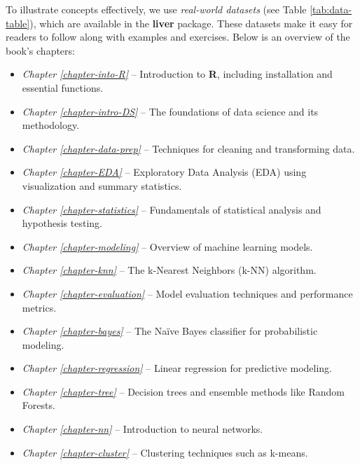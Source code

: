 \documentclass[
  11pt,
]{book}
\providecommand{\tightlist}{%
  \setlength{\itemsep}{0pt}\setlength{\parskip}{0pt}}
\theoremstyle{definition}
\theoremstyle{definition}
\theoremstyle{definition}
\theoremstyle{definition}
\theoremstyle{remark}
\begin{document}
To illustrate concepts effectively, we use \emph{real-world datasets} (see Table \ref{tab:data-table}), which are available in the \textbf{liver} package. These datasets make it easy for readers to follow along with examples and exercises. Below is an overview of the book's chapters:

\begin{itemize}
\tightlist
\item
  \emph{Chapter \ref{chapter-into-R}} -- Introduction to \textbf{R}, including installation and essential functions.\\
\item
  \emph{Chapter \ref{chapter-intro-DS}} -- The foundations of data science and its methodology.\\
\item
  \emph{Chapter \ref{chapter-data-prep}} -- Techniques for cleaning and transforming data.\\
\item
  \emph{Chapter \ref{chapter-EDA}} -- Exploratory Data Analysis (EDA) using visualization and summary statistics.\\
\item
  \emph{Chapter \ref{chapter-statistics}} -- Fundamentals of statistical analysis and hypothesis testing.\\
\item
  \emph{Chapter \ref{chapter-modeling}} -- Overview of machine learning models.\\
\item
  \emph{Chapter \ref{chapter-knn}} -- The k-Nearest Neighbors (k-NN) algorithm.\\
\item
  \emph{Chapter \ref{chapter-evaluation}} -- Model evaluation techniques and performance metrics.\\
\item
  \emph{Chapter \ref{chapter-bayes}} -- The Naïve Bayes classifier for probabilistic modeling.\\
\item
  \emph{Chapter \ref{chapter-regression}} -- Linear regression for predictive modeling.\\
\item
  \emph{Chapter \ref{chapter-tree}} -- Decision trees and ensemble methods like Random Forests.\\
\item
  \emph{Chapter \ref{chapter-nn}} -- Introduction to neural networks.\\
\item
  \emph{Chapter \ref{chapter-cluster}} -- Clustering techniques such as k-means.
\end{itemize}
\end{document}
